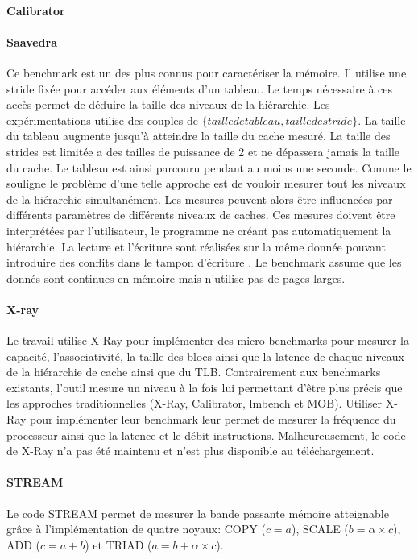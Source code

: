 \paragraph{Calibrator}


\paragraph{Saavedra} Ce benchmark est un des plus connus pour caractériser la mémoire. Il utilise une stride fixée pour accéder aux éléments d'un tableau. Le temps nécessaire à ces accès permet de déduire la taille des niveaux de la hiérarchie. Les expérimentations utilise des couples de $\{taille de tableau, taille de stride\}$. La taille du tableau augmente jusqu'à atteindre la taille du cache mesuré. La taille des strides est limitée a des tailles de puissance de 2 et ne dépassera jamais la taille du cache. Le tableau est ainsi parcouru pendant au moins une seconde. Comme le souligne \cite{Yotov2005} le problème d'une telle approche est de vouloir mesurer tout les niveaux de la hiérarchie simultanément. Les mesures peuvent alors être influencées par différents paramètres de différents niveaux de caches. Ces mesures doivent être interprétées par l'utilisateur, le programme ne créant pas automatiquement la hiérarchie. La lecture et l'écriture sont réalisées sur la même donnée pouvant introduire des conflits dans le tampon d'écriture  \cite{Yotov2005}. Le benchmark assume que les donnés sont continues en mémoire mais n'utilise pas de pages larges.


\paragraph{X-ray}
Le travail \cite{Yotov2005} utilise X-Ray pour implémenter des micro-benchmarks pour mesurer la capacité, l'associativité, la taille des blocs ainsi que la latence de chaque niveaux de la hiérarchie de cache ainsi que du TLB. Contrairement aux benchmarks existants, l'outil mesure un niveau à la fois lui permettant d'être plus précis que les approches traditionnelles (X-Ray, Calibrator, lmbench et MOB). Utiliser X-Ray pour implémenter leur benchmark leur permet de mesurer la fréquence du processeur ainsi que la latence et le débit instructions. Malheureusement, le code de X-Ray n'a pas été maintenu et n'est plus disponible au téléchargement.


\paragraph{STREAM} Le code STREAM permet de mesurer la bande passante mémoire atteignable grâce à l'implémentation de quatre noyaux: COPY ($c=a$), SCALE ($b=\alpha \times c$), ADD ($c=a+b$) et TRIAD ($a=b+\alpha \times c$).


